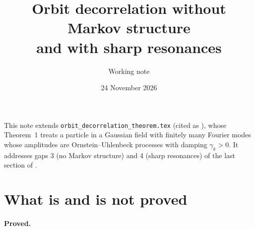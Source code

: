 \documentclass[11pt]{article}
\title{Orbit decorrelation without Markov structure\\
and with sharp resonances}
\author{Working note}
\date{24 November 2026}
\theoremstyle{remark}
\begin{document}
\maketitle

This note extends \texttt{orbit\_decorrelation\_theorem.tex} (cited as
\cite{Note}), whose Theorem~1 treats a particle in a Gaussian field with
finitely many Fourier modes whose amplitudes are Ornstein--Uhlenbeck
processes with damping $\gamma_k>0$. It addresses gaps 3 (no Markov
structure) and 4 (sharp resonances) of the last section of \cite{Note}.

\section{What is and is not proved}

\paragraph{Proved.}
\end{document}
